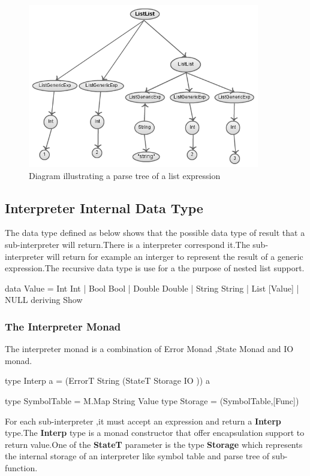 \begin{figure}[H]
  \centering
	\includegraphics[width=0.90\textwidth]{pic/c6/parse_tree_2.png}
	\caption{Diagram illustrating a parse tree of a list expression}
\end{figure}


\subsection{Interpreter Internal Data Type}
The data type defined as below shows that the possible data type of result that a sub-interpreter will return.There is a interpreter correspond it.The sub-interpreter will return for example an interger to represent the result of a generic expression.The recursive data type is use for a the purpose of nested list support. 
\begin{hcode}
data Value =  Int Int 
             | Bool Bool
             | Double Double
             | String String 
             | List [Value]
             | NULL    deriving Show
\end{hcode}


\subsubsection{The Interpreter Monad}
The interpreter monad is a combination of Error Monad ,State Monad and IO monad.

\begin{hcode}
type Interp a  = (ErrorT String (StateT Storage IO )) a

type SymbolTable = M.Map String Value
type Storage = (SymbolTable,[Func])
\end{hcode}


For each sub-interpreter ,it must accept an expression and return a \textbf{Interp} type.The \textbf{Interp} type is a monad constructor that offer encapsulation support to return value.One of the \textbf{StateT} parameter is the type \textbf{Storage} which represents the internal storage of an interpreter like symbol table and parse tree of sub-function.



